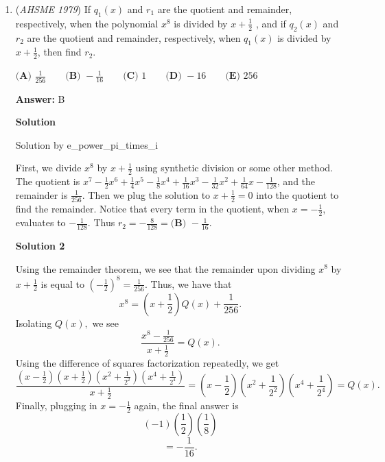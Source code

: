 \begin{enumerate}
 $AD$ is the hypotenuse of right $\triangle AED$, with leg lengths $AB+BE=7$ and $EC+CD=24$. Thus, $AD=\boxed{\textbf{(E)}25}$

 -WannabeCharmander

 


	\item (\textit{AHSME 1979}) If $q_1 ( x )$ and $r_ 1$ are the quotient and remainder, respectively, when the polynomial $x^ 8$ is divided by 
$x + \frac{1}{2}$ , and if $q_ 2 ( x )$ and $r_2$ are the quotient and remainder, respectively, 
when $q_ 1 ( x )$ is divided by $x + \frac{1}{2}$, then find $r_2$.


 $\textbf{(A) }\frac{1}{256}\qquad \textbf{(B) }-\frac{1}{16}\qquad \textbf{(C) }1\qquad \textbf{(D) }-16\qquad \textbf{(E) }256$

 \textbf{Answer: }B



\textbf{Solution}

Solution by e\_power\_pi\_times\_i

 First, we divide $x^8$ by $x+\frac{1}{2}$ using synthetic division or some other method. The quotient is $x^7-\frac{1}{2}x^6+\frac{1}{4}x^5-\frac{1}{8}x^4+\frac{1}{16}x^3-\frac{1}{32}x^2+\frac{1}{64}x-\frac{1}{128}$, and the remainder is $\frac{1}{256}$. Then we plug the solution to $x+\frac{1}{2} = 0$ into the quotient to find the remainder. Notice that every term in the quotient, when $x=-\frac{1}{2}$, evaluates to $-\frac{1}{128}$. Thus $r_2 =-\frac{8}{128} = \boxed{\textbf{(B) } -\frac{1}{16}}$.

 



\textbf{Solution 2}

Using the remainder theorem, we see that the remainder upon dividing $x^8$ by $x+\frac{1}{2}$ is equal to $\left(-\frac{1}{2}\right)^8 = \frac{1}{256}.$ Thus, we have that
 \[x^8 = \left(x+\frac{1}{2}\right)Q(x) + \frac{1}{256}.\]Isolating $Q(x),$ we see
 \[\frac{x^8-\frac{1}{256}}{x+\frac{1}{2}} = Q(x).\]Using the difference of squares factorization repeatedly, we get
 \[\frac{\left(x-\frac{1}{2}\right)\left(x+\frac{1}{2}\right)\left(x^2+\frac{1}{2^2}\right)\left(x^4+\frac{1}{2^4}\right)}{x+\frac{1}{2}}=\left(x-\frac{1}{2}\right)\left(x^2+\frac{1}{2^2}\right)\left(x^4+\frac{1}{2^4}\right)=Q(x).\]Finally, plugging in $x=-\frac{1}{2}$ again, the final answer is
 \[(-1)\left(\frac{1}{2}\right)\left(\frac{1}{8}\right)\]
 \[=\boxed{-\frac{1}{16}}.\]




\end{enumerate}
